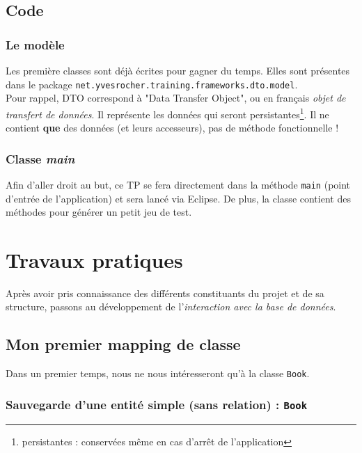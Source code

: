 \documentclass[small,algo]{dushClass} %
\begin{document}
\subsection{Code}

\subsubsection{Le modèle}

Les première classes sont déjà écrites pour gagner du temps. Elles sont présentes dans le package \texttt{net.yvesrocher.training.frameworks.dto.model}.\\

Pour rappel, DTO correspond à "Data Transfer Object", ou en français \emph{objet de transfert de données}. Il représente les données qui seront persistantes\footnote{persistantes : conservées même en cas d'arrêt de l'application}. Il ne contient \textbf{que} des données (et leurs accesseurs), pas de méthode fonctionnelle !

\subsubsection{Classe \emph{main}}

Afin d'aller droit au but, ce TP se fera directement dans la méthode \texttt{main} (point d'entrée de l'application) et sera lancé via Eclipse. De plus, la classe contient des méthodes pour générer un petit jeu de test.


\section{Travaux pratiques}

Après avoir pris connaissance des différents constituants du projet et de sa structure, passons au développement de l'\emph{interaction avec la base de données}.

\subsection{Mon premier mapping de classe}

Dans un premier temps, nous ne nous intéresseront qu'à la classe \texttt{Book}.

\subsubsection{Sauvegarde d'une entité simple (sans relation) : \texttt{Book}}
\end{document}

